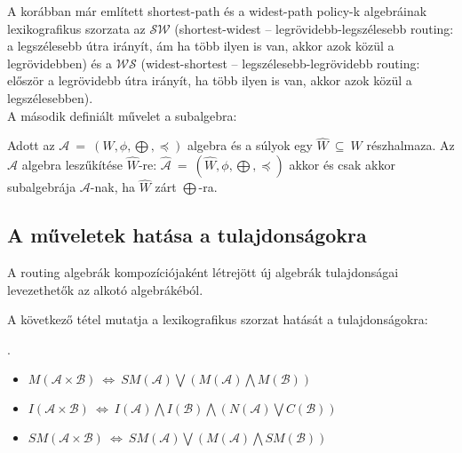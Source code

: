   A korábban már említett shortest-path és a widest-path policy-k algebráinak lexikografikus szorzata az $\mathcal{SW}$ (shortest-widest -- legrövidebb-legszélesebb routing: a legszélesebb útra irányít, ám ha több ilyen is van, akkor azok közül a legrövidebben) és a $\mathcal{WS}$ (widest-shortest -- legszélesebb-legrövidebb routing: először a legrövidebb útra irányít, ha több ilyen is van, akkor azok közül a legszélesebben).\\

  A második definiált művelet a subalgebra:
  \begin{definition} 
    Adott az $\mathcal{A}~=~(W,\phi,\bigoplus,\preceq)$ algebra és a súlyok egy $\hat{W}~\subseteq~W$ részhalmaza. Az $\mathcal{A}$ algebra leszűkítése $\hat{W}$-re: $\hat{\mathcal{A}}~=~(\hat{W},\phi,\bigoplus,\preceq)$ akkor és csak akkor subalgebrája $\mathcal{A}$-nak, ha $\hat{W}$ zárt $\bigoplus$-ra.
  \end{definition}

    \subsection{A műveletek hatása a tulajdonságokra}\label{section_algebramuveletek_tulajdonsagok}

    A routing algebrák kompozíciójaként létrejött új algebrák tulajdonságai levezethetők az alkotó algebrákéból.

    A következő tétel mutatja a lexikografikus szorzat hatását a tulajdonságokra:
    \begin{theorem}\label{eq:lexi}
      .
      \begin{itemize}
      \item $M(\mathcal{A} \times \mathcal{B})~\Leftrightarrow~ SM(\mathcal{A}) \bigvee (M(\mathcal{A}) \bigwedge M(\mathcal{B}))$
      \item $I(\mathcal{A} \times \mathcal{B})~\Leftrightarrow~ I(\mathcal{A}) \bigwedge I(\mathcal{B}) \bigwedge (N(\mathcal{A}) \bigvee C(\mathcal{B}))$
      \item $SM(\mathcal{A} \times \mathcal{B})~\Leftrightarrow~ SM(\mathcal{A}) \bigvee (M(\mathcal{A}) \bigwedge SM(\mathcal{B}))$\\
      \end{itemize}
    \end{theorem}

